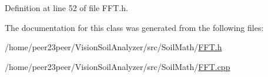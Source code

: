 Definition at line 52 of file F\+F\+T.\+h.



The documentation for this class was generated from the following files\+:\begin{DoxyCompactItemize}
\item 
/home/peer23peer/\+Vision\+Soil\+Analyzer/src/\+Soil\+Math/\hyperlink{_f_f_t_8h}{F\+F\+T.\+h}\item 
/home/peer23peer/\+Vision\+Soil\+Analyzer/src/\+Soil\+Math/\hyperlink{_f_f_t_8cpp}{F\+F\+T.\+cpp}\end{DoxyCompactItemize}
